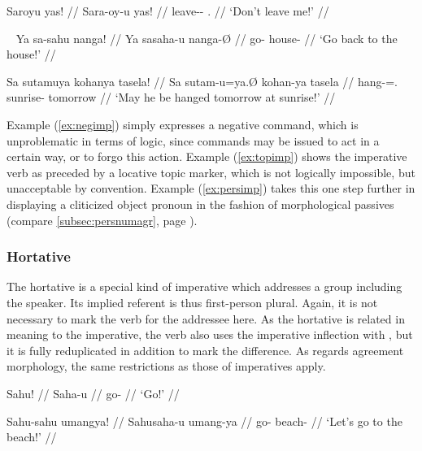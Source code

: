 \ex\label{ex:negimp}\begingl
	\gla Saroyu yas! //
	\glb Sara-oy-u yas! //
	\glc leave-\Neg{}-\Imp{} \Fsg{}.\Parg{} //
	\glft `Don't leave me!' //
\endgl\xe

\pex~\label{ex:agrimp}
\a\label{ex:topimp}\ljudge*\begingl
	\gla Ya sa-sahu nanga! //
	\glb Ya sa\til{}saha-u nanga-Ø //
	\glc \LocT{} \Iter{}\til{}go-\Imp{} house-\Top{} //
	\glft `Go back to the house!' //
\endgl

\a\label{ex:persimp}\ljudge*\begingl
	\gla Sa sutamuya kohanya tasela! //
	\glb Sa sutam-u=ya.Ø kohan-ya tasela //
	\glc \PatT{} hang-\Imp{}=\TsgM{}.\Top{} sunrise-\Loc{} tomorrow //
	\glft `May he be hanged tomorrow at sunrise!' //
\endgl
\xe

Example (\ref{ex:negimp}) simply expresses a negative command, which is 
unproblematic in terms of logic, since commands may be issued to act in a 
certain way, or to forgo this action. Example (\ref{ex:topimp}) shows the 
imperative verb as preceded by a locative topic marker, which is not logically 
impossible, but unacceptable by convention. Example (\ref{ex:persimp}) takes 
this one step further in displaying a cliticized object pronoun in the fashion 
of morphological passives (compare \autoref{subsec:persnumagr}, page 
\pageref{patagr}).


\subsubsection{Hortative}

The hortative is a special kind of imperative which addresses a group 
including the speaker. Its implied referent is thus first-person plural. 
Again, it is not necessary to mark the verb for the addressee here. As 
the hortative is related in meaning to the imperative, the verb also uses the 
imperative inflection with , but it is fully reduplicated in 
addition to mark the difference. As regards agreement morphology, the same 
restrictions as those of imperatives apply.

\pex
\a\begingl
	\gla Sahu! //
	\glb Saha-u //
	\glc go-\Imp{} //
	\glft `Go!' //
\endgl

\a\begingl
	\gla Sahu-sahu umangya! //
	\glb Sahu\til{}saha-u umang-ya //
	\glc \Hort{}\til{}go-\Imp{} beach-\Loc{} //
	\glft `Let's go to the beach!' //
\endgl
\xe



